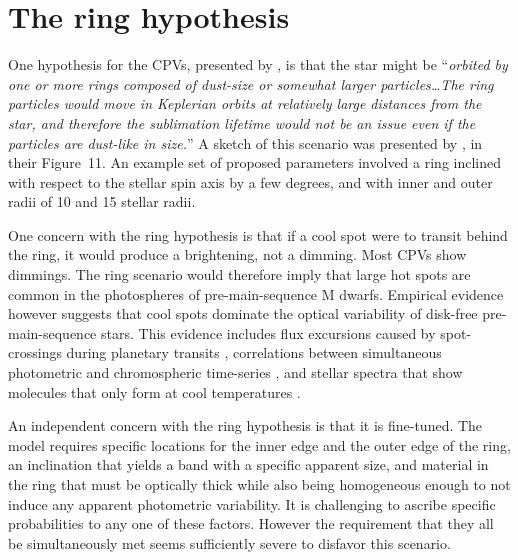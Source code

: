 \documentclass[11pt,twocolumn,tighten]{aastex63}
\begin{document}

\appendix

\section{The ring hypothesis}
\label{app:ring}

One hypothesis for the CPVs, presented by \citet{2019ApJ...876..127Z},
is that the star might be ``{\it orbited by one or more rings composed
of dust-size or somewhat larger particles\ldots The ring particles
would move in Keplerian orbits at relatively large distances from the
star, and therefore the sublimation lifetime would not be an issue
even if the particles are dust-like in size.}'' A sketch of this
scenario was presented by \citet{2019ApJ...876..127Z}, in their
Figure~11.  An example set of proposed parameters involved a ring
inclined with respect to the stellar spin axis by a few degrees, and
with inner and outer radii of 10 and 15 stellar radii.

One concern with the ring hypothesis is that if a cool spot were to
transit behind the ring, it would produce a brightening, not a
dimming.   Most CPVs show dimmings.   The ring scenario would therefore
imply that large hot spots are common in the photospheres of
pre-main-sequence M dwarfs.  Empirical evidence however suggests that
cool spots dominate the optical variability of disk-free
pre-main-sequence stars.  This evidence includes flux excursions
caused by spot-crossings during planetary transits
\citep[e.g.][]{2020AJ....160...33R,2022AJ....163..147G}, correlations
between simultaneous photometric and chromospheric time-series
\citep{2019A&A...621A..21R}, and stellar spectra that show molecules
that only form at cool temperatures
\citep[e.g.][]{2017ApJ...836..200G,2023ApJ...946...10P}.

An independent  concern with the ring hypothesis is that it is
fine-tuned.  The model requires specific locations for the inner edge
and the outer edge of the ring, an inclination that yields a band with
a specific apparent size, and material in the ring that must be
optically thick while also being homogeneous enough to not induce any
apparent photometric variability.  It is challenging to ascribe
specific probabilities to any one of these factors.  However the
requirement that they all be simultaneously met seems sufficiently
severe to disfavor this scenario.
\end{document}

